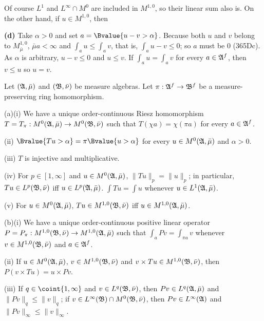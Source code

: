 {\medskip

 Of course $L^1$ and $L^{\infty}\cap M^0$ are included
in $M^{1,0}$, so their linear sum also is.   On the other hand, if $u\in
M^{1,0}$, then


\medskip

{\bf (d)} Take $\alpha>0$ and set $a=\Bvalue{u-v>\alpha}$.   Because
both $u$ and
$v$ belong to $M^{1,0}_{\bar\mu}$, $\bar\mu a<\infty$ and
$\int_au\le\int_av$, that is, $\int_au-v\le 0$;  so $a$ must be $0$
(365Dc).   As $\alpha$ is arbitrary, $u-v\le 0$ and $u\le v$.
If $\int_au=\int_av$ for every $a\in\frak A^f$, then $v\le u$ so
$u=v$.
}%

 Let $(\frak A,\bar\mu)$ and $(\frak B,\bar\nu)$
be measure algebras.   Let $\pi:\frak A^f\to\frak B^f$ be a
measure-preserving ring homomorphism.

(a)(i) We have a unique order-continuous Riesz homomorphism
$T=T_{\pi}:M^0(\frak A,\bar\mu)\to M^0(\frak B,\bar\nu)$ such that
$T(\chi a)=\chi(\pi a)$ for every $a\in\frak A^f$.

\quad(ii) $\Bvalue{Tu>\alpha}=\pi\Bvalue{u>\alpha}$ for every
$u\in M^0(\frak A,\bar\mu)$ and $\alpha>0$.

\quad(iii) $T$ is injective and multiplicative.

\quad(iv) For $p\in[1,\infty]$ and $u\in M^0(\frak A,\bar\mu)$,
$\|Tu\|_p=\|u\|_p$;  in particular, $Tu\in L^p(\frak B,\bar\nu)$ iff
$u\in L^p(\frak A,\bar\mu)$.   $\int Tu=\int u$
whenever $u\in L^1(\frak A,\bar\mu)$.

\quad(v) For $u\in M^0(\frak A,\bar\mu)$,
$Tu\in M^{1,0}(\frak B,\bar\nu)$ iff $u\in M^{1,0}(\frak A,\bar\mu)$.

(b)(i) We have a unique order-continuous positive linear operator
$P=P_{\pi}:M^{1,0}(\frak B,\bar\nu)\to M^{1,0}(\frak A,\bar\mu)$ such
that
$\int_aPv=\int_{\pi a}v$ whenever $v\in M^{1,0}(\frak B,\bar\nu)$ and
$a\in\frak A^f$.

\quad(ii) If $u\in M^0(\frak A,\bar\mu)$,
$v\in M^{1,0}(\frak B,\bar\nu)$ and
$v\times Tu\in M^{1,0}(\frak B,\bar\nu)$, then
$P(v\times Tu)=u\times Pv$.

\quad(iii) If $q\in\coint{1,\infty}$ and $v\in L^q(\frak B,\bar\nu)$,
then
$Pv\in L^q(\frak A,\bar\mu)$ and $\|Pv\|_q\le\|v\|_q$;  if
$v\in L^{\infty}(\frak B)\cap M^0(\frak B,\bar\nu)$, then
$Pv\in L^{\infty}(\frak A)$ and $\|Pv\|_{\infty}\le\|v\|_{\infty}$.


